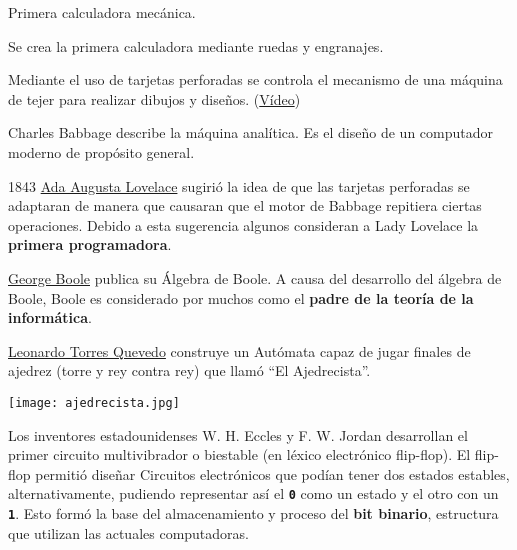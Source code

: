 \begin{description}
    \item[1623] Primera calculadora mecánica.

    \item[1666] Se crea la primera calculadora mediante ruedas y engranajes.

    \item[1801] Mediante el uso de tarjetas perforadas se controla el mecanismo de una máquina de tejer para realizar dibujos y diseños. (\href{https://www.youtube.com/watch?v=MQzpLLhN0fY}{Vídeo})

    \item[1837] Charles Babbage describe la máquina analítica. Es el diseño de un computador moderno de propósito general.

    \begin{minipage}{0.7\linewidth}
        \item[1843] \href{https://es.wikipedia.org/wiki/Ada_Lovelace}{Ada Augusta Lovelace} sugirió la idea de que las tarjetas perforadas se adaptaran de manera que causaran que el motor de Babbage repitiera ciertas operaciones. Debido a esta sugerencia algunos consideran a Lady Lovelace la \textbf{primera programadora}.
    \end{minipage}
    \hfill
    \begin{minipage}{0.2\linewidth}
        \hfill
        
    \end{minipage}

    \item[1854] \href{https://es.wikipedia.org/wiki/George_Boole}{George Boole} publica su Álgebra de Boole. A causa del desarrollo del álgebra de Boole, Boole es considerado por muchos como el \textbf{padre de la teoría de la informática}.

    \item[1912] \href{https://es.wikipedia.org/wiki/Leonardo_Torres_Quevedo}{Leonardo Torres Quevedo} construye un Autómata capaz de jugar finales de ajedrez (torre y rey contra rey)  que llamó “El Ajedrecista”.

    \begin{center}
        \texttt{[image: ajedrecista.jpg]}
    \end{center}

    \item[1919] Los inventores estadounidenses W. H. Eccles y F. W. Jordan desarrollan el primer circuito multivibrador o biestable (en léxico electrónico flip-flop). El flip-flop permitió diseñar Circuitos electrónicos que podían tener dos estados estables, alternativamente, pudiendo representar así el \textbf{\texttt{0}} como un estado y el otro con un \textbf{\texttt{1}}. Esto formó la base del almacenamiento y proceso del \textbf{bit binario}, estructura que utilizan las actuales computadoras.


\end{description}
